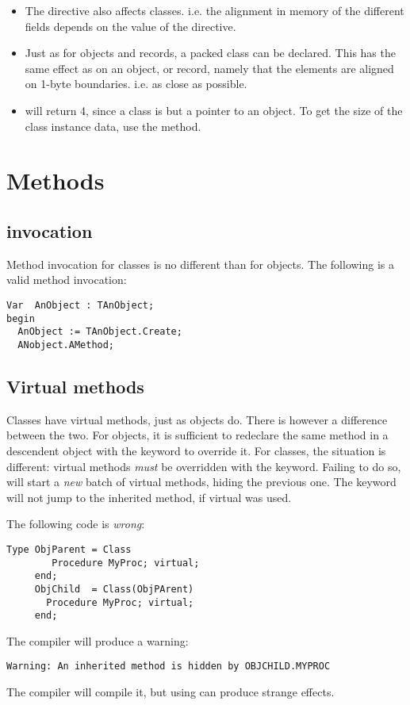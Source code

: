 \begin{remark}
\begin{itemize}
\item The  directive also affects classes.
i.e. the alignment in memory of the different fields depends on the
value of  the  directive.
\item Just as for objects and records, a packed class can be declared.
This has the same effect as on an object, or record, namely that the
elements are aligned on 1-byte boundaries. i.e. as close as possible.
\item {} will return 4, since a class is but a pointer to
an object. To get the size of the class instance data, use the
 method.
\end{itemize}
\end{remark}

\section{Methods}
\subsection{invocation}
Method invocation for classes is no different than for objects. The
following is a valid method invocation:
\begin{verbatim}
Var  AnObject : TAnObject;
begin
  AnObject := TAnObject.Create;
  ANobject.AMethod;
\end{verbatim}
\subsection{Virtual methods}
Classes have virtual methods, just as objects do. There is however a
difference between the two. For objects, it is sufficient to redeclare the
same method in a descendent object with the keyword  to
override it. For classes, the situation is different:
 virtual methods {\em must} be overridden with the  keyword. Failing to do so,
will start a {\em new} batch of virtual methods, hiding the previous
one.  The  keyword will not jump to the inherited method, if
virtual was used.

The following code is {\em wrong}:
\begin{verbatim}
Type ObjParent = Class
        Procedure MyProc; virtual;
     end;
     ObjChild  = Class(ObjPArent)
       Procedure MyProc; virtual;
     end;
\end{verbatim}
The compiler will produce a warning:
\begin{verbatim}
Warning: An inherited method is hidden by OBJCHILD.MYPROC
\end{verbatim}
The compiler will compile it, but using  can
produce strange effects.

